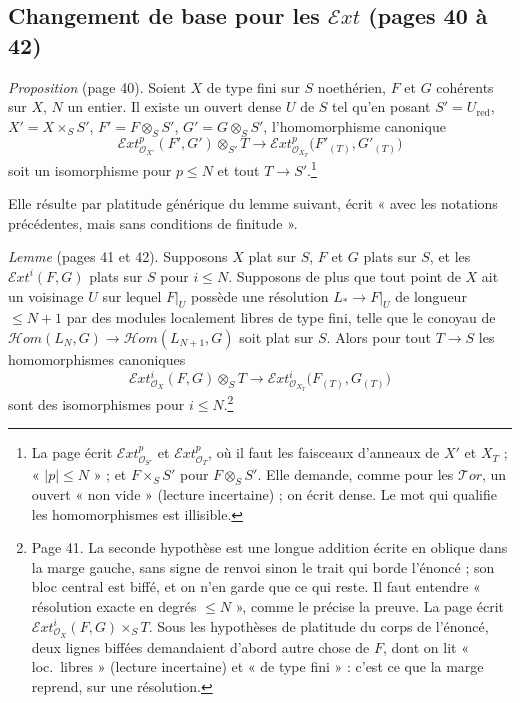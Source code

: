 \documentclass[11pt,a4paper]{article}
\begin{document}
\subsection*{Changement de base pour les $\mathcal{E}xt$ (pages 40 à 42)}

\emph{Proposition} (page 40). Soient $X$ de type fini sur $S$ noethérien,
$F$ et $G$ cohérents sur $X$, $N$ un entier. Il existe un ouvert dense $U$
de $S$ tel qu'en posant $S' = U_{\mathrm{red}}$, $X' = X \times_S S'$,
$F' = F \otimes_S S'$, $G' = G \otimes_S S'$, l'homomorphisme canonique
\[
  \mathcal{E}xt^{p}_{\mathcal{O}_{X'}}(F', G') \otimes_{S'} T \longrightarrow
  \mathcal{E}xt^{p}_{\mathcal{O}_{X_T}}\bigl(F'_{(T)}, G'_{(T)}\bigr)
\]
soit un isomorphisme pour $p \leq N$ et tout $T \to S'$.\footnote{La page
écrit $\mathcal{E}xt^{p}_{\mathcal{O}_{S'}}$ et
$\mathcal{E}xt^{p}_{\mathcal{O}_{T}}$, où il faut les faisceaux d'anneaux de
$X'$ et $X_T$ ; « $|p| \leq N$ » ; et $F \times_S S'$ pour
$F \otimes_S S'$. Elle demande, comme pour les $\mathcal{T}or$, un ouvert
« non vide » (lecture incertaine) ; on écrit dense. Le mot qui qualifie
les homomorphismes est illisible.}

Elle résulte par platitude générique du lemme suivant, écrit « avec les
notations précédentes, mais sans conditions de finitude ».

\emph{Lemme} (pages 41 et 42). Supposons $X$ plat sur $S$, $F$ et $G$ plats
sur $S$, et les $\mathcal{E}xt^{i}(F, G)$ plats sur $S$ pour $i \leq N$.
Supposons de plus que tout point de $X$ ait un voisinage $U$ sur lequel
$F|_U$ possède une résolution $L_{*} \to F|_U$ de longueur $\leq N + 1$ par
des modules localement libres de type fini, telle que le conoyau de
$\mathcal{H}om(L_N, G) \to \mathcal{H}om(L_{N+1}, G)$ soit plat sur $S$.
Alors pour tout $T \to S$ les homomorphismes canoniques
\[
  \mathcal{E}xt^{i}_{\mathcal{O}_X}(F, G) \otimes_S T \longrightarrow
  \mathcal{E}xt^{i}_{\mathcal{O}_{X_T}}\bigl(F_{(T)}, G_{(T)}\bigr)
\]
sont des isomorphismes pour $i \leq N$.\footnote{Page 41. La seconde
hypothèse est une longue addition écrite en oblique dans la marge gauche,
sans signe de renvoi sinon le trait qui borde l'énoncé ; son bloc central est
biffé, et on n'en garde que ce qui reste. Il faut entendre « résolution
exacte en degrés $\leq N$ », comme le précise la preuve. La page écrit
$\mathcal{E}xt^{i}_{\mathcal{O}_X}(F, G) \times_S T$. Sous les hypothèses
de platitude du corps de l'énoncé, deux lignes biffées demandaient d'abord
autre chose de $F$, dont on lit « loc.\ libres » (lecture incertaine) et
« de type fini » : c'est ce que la marge reprend, sur une résolution.}
\end{document}
